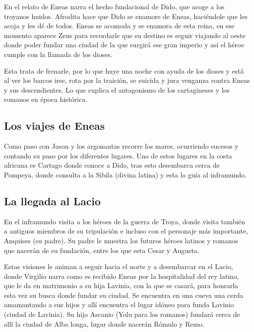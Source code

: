 En el relato de Eneas narra el hecho fundacional de Dido, que acoge a los troyanos huidos. Afrodita hace que Dido se enamore de Eneas, haciéndole que les acoja y les dé de todos. Eneas se acomoda y se enamora de esta reina, en ese momento aparece Zeus para recordarle que su destino es seguir viajando al oeste donde poder fundar una ciudad de la que surgirá ese gran imperio y así el héroe cumple con la llamada de los dioses.

Esta trata de frenarle, por lo que huye una noche con ayuda de los dioses y está al ver los barcos irse, rota por la traición, se suicida y jura venganza contra Eneas y sus descendientes. Lo que explica el antagonismo de los cartagineses y los romanos en época histórica.

\subsection{Los viajes de Eneas}
Como paso con Jason y los argonautas recorre los mares, ocurriendo sucesos y contando su paso por los diferentes lugares. Uno de estos lugares en la costa africana es Cartago donde conoce a Dido, tras esto desembarca cerca de Pompeya, donde consulta a la Sibila (divina latina) y esta lo guía al inframundo.

\subsection{La llegada al Lacio}
En el inframundo visita a los héroes de la guerra de Troya, donde visita también a antiguos miembros de su tripulación e incluso con el personaje más importante, Anquises (su padre). Su padre le muestra los futuros héroes latinos y romanos que nacerán de su fundación, entre los que esta Cesar y Augusto.

Estas visiones le animan a seguir hacia el norte y a desembarcar en el Lacio, donde Virgilio narra como es recibido Eneas por la hospitalidad del rey latino, que le da en matrimonio a su hija Lavinia, con la que se casará, para honrarla esta vez su busca donde fundar su ciudad. Se encuentra en una cueva una cerda amamantando a sus hijos y allí encuentra el lugar idóneo para funda Lavinio (ciudad de Lavinia). Su hijo Ascanio (Yolu para los romanos) fundará cerca de allí la ciudad de Alba longa, lugar donde nacerán Rómulo y Remo.